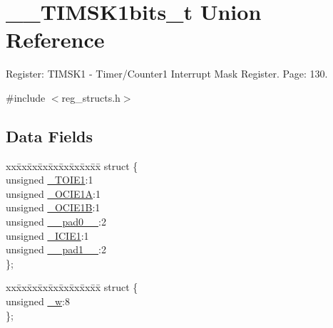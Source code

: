 \hypertarget{union_____t_i_m_s_k1bits__t}{\section{\+\_\+\+\_\+\+T\+I\+M\+S\+K1bits\+\_\+t Union Reference}
\label{union_____t_i_m_s_k1bits__t}
}


Register\+: T\+I\+M\+S\+K1 -\/ Timer/\+Counter1 Interrupt Mask Register. Page\+: 130.  




{\ttfamily \#include $<$reg\+\_\+structs.\+h$>$}

\subsection*{Data Fields}
\begin{DoxyCompactItemize}
\item 
\begin{tabbing}
xx\=xx\=xx\=xx\=xx\=xx\=xx\=xx\=xx\=\kill
struct \{\\
\>unsigned \hyperlink{union_____t_i_m_s_k1bits__t_a6c48fb5a18bc0b54786423745de5d24e}{\_TOIE1}:1\\
\>unsigned \hyperlink{union_____t_i_m_s_k1bits__t_adf1319ad94e6ebc2dc04ebe9235b44bd}{\_OCIE1A}:1\\
\>unsigned \hyperlink{union_____t_i_m_s_k1bits__t_a389e5a78166c37ede561268b9a143471}{\_OCIE1B}:1\\
\>unsigned \hyperlink{union_____t_i_m_s_k1bits__t_a4a8430370a3d278b9b8b1df8cb5c675e}{\_\_pad0\_\_}:2\\
\>unsigned \hyperlink{union_____t_i_m_s_k1bits__t_a0ff35531832f1bc4b27070b090630bf4}{\_ICIE1}:1\\
\>unsigned \hyperlink{union_____t_i_m_s_k1bits__t_a52cec2ba6804b4075e7869303c599aee}{\_\_pad1\_\_}:2\\
\}; \\

\end{tabbing}\item 
\begin{tabbing}
xx\=xx\=xx\=xx\=xx\=xx\=xx\=xx\=xx\=\kill
struct \{\\
\>unsigned \hyperlink{union_____t_i_m_s_k1bits__t_a74e0285088f5c632162f2b0e30698940}{\_w}:8\\
\}; \\

\end{tabbing}\end{DoxyCompactItemize}


